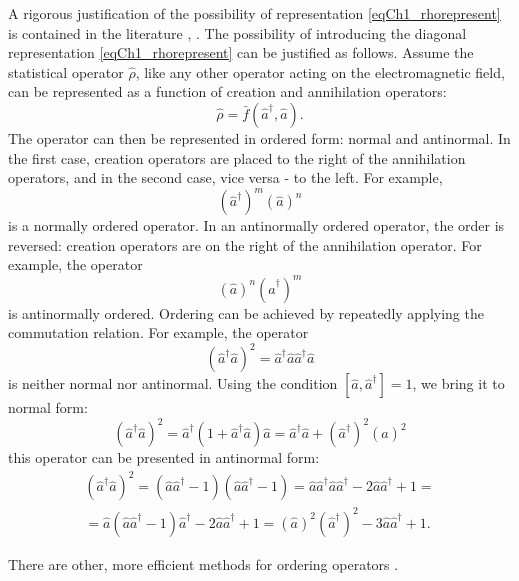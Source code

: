 A rigorous justification of the possibility of representation \eqref{eqCh1_rhorepresent} is contained in the literature \cite{bQuantumOpticsAndRadioPhisicsLecture1966}, \cite{bKaluderSudershan1970}. The possibility of introducing the diagonal representation \eqref{eqCh1_rhorepresent} can be justified as follows. Assume the statistical operator $\hat{\rho}$, like any other operator acting on the electromagnetic field, can be represented as a function of creation and annihilation operators:
\[
\hat{\rho} = \bar{f}\left(\hat{a}^{\dag}, \hat{a}\right).
\]
The operator can then be represented in ordered form: normal and antinormal. In the first case, creation operators are placed to the right of the annihilation operators, and in the second case, vice versa - to the left. For example,
\[
\left(\hat{a}^{\dag}\right)^m\left(\hat{a}\right)^n
\]
is a normally ordered operator. In an antinormally ordered operator, the order is reversed: creation operators are on the right of the annihilation operator. For example, the operator 
\[
\left(\hat{a}\right)^n\left(\hat{a}^{\dag}\right)^m
\]
is antinormally ordered. Ordering can be achieved by repeatedly applying the commutation relation. For example, the operator 
\[
\left(\hat{a}^{\dag}\hat{a}\right)^2 =
\hat{a}^{\dag}\hat{a}\hat{a}^{\dag}\hat{a} 
\]
is neither normal nor antinormal. Using the condition 
$\left[\hat{a},\hat{a}^{\dag}\right] = 1$,
we bring it to normal form: 
\[
\left(\hat{a}^{\dag}\hat{a}\right)^2 = \hat{a}^{\dag}\left(1 +
\hat{a}^{\dag}\hat{a}\right)\hat{a} = 
\hat{a}^{\dag}\hat{a} + \left(\hat{a}^{\dag}\right)^2\left(\hat{a}\right)^2
\]
this operator can be presented in antinormal form:
\begin{eqnarray}
\left(\hat{a}^{\dag}\hat{a}\right)^2 = 
\left(\hat{a}\hat{a}^{\dag} - 1\right) \left(\hat{a}\hat{a}^{\dag} -
1\right) = \hat{a}\hat{a}^{\dag} \hat{a}\hat{a}^{\dag} - 2
\hat{a}\hat{a}^{\dag} + 1 =
\nonumber \\
= \hat{a}\left(\hat{a}\hat{a}^{\dag} - 1\right)\hat{a}^{\dag} -
2\hat{a}\hat{a}^{\dag} + 1 = 
\left(\hat{a}\right)^2\left(\hat{a}^{\dag}\right)^2 - 3
\hat{a}\hat{a}^{\dag} + 1.
\nonumber
\end{eqnarray}

There are other, more efficient methods for ordering operators \cite{bLuisell1972}.

